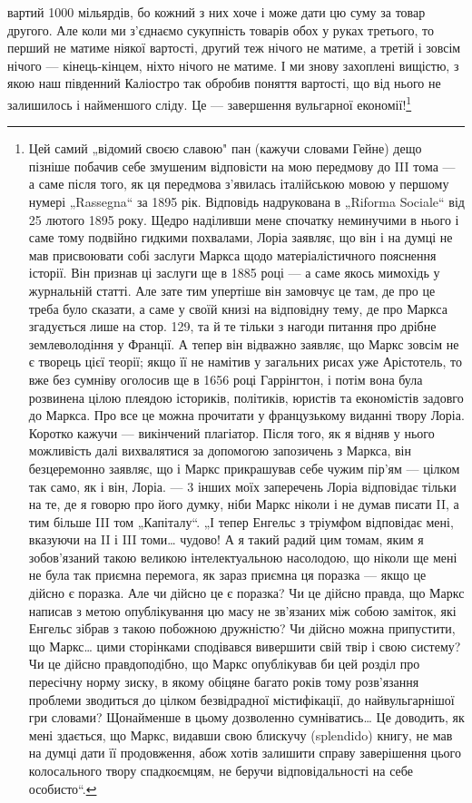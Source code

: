 \parcont{}  %
вартий 1000 мільярдів, бо кожний з них хоче і може дати цю суму за товар другого. Але коли ми з'єднаємо сукупність товарів
обох у руках третього, то перший не матиме ніякої вартості, другий теж нічого не матиме, а третій і зовсім нічого — кінець-кінцем, ніхто
нічого не матиме. І ми знову захоплені вищістю, з якою наш південний Каліостро так обробив поняття вартості,
що від нього не залишилось і найменшого сліду. Це — завершення вульгарної економії!\footnote{Цей самий „відомий своєю славою" пан (кажучи словами Гейне) дещо пізніше побачив себе змушеним відповісти на мою передмову
до III тома — а саме після того, як ця передмова з’явилась італійською мовою у першому нумері „Rassegna“ за 1895 рік.
Відповідь надрукована в „Riforma Sociale“ від 25 лютого 1895 року. Щедро наділивши мене спочатку неминучими в нього і саме
тому подвійно гидкими похвалами, Лоріа заявляє, що він і на думці не мав присвоювати собі заслуги Маркса щодо
матеріалістичного пояснення історії. Він признав ці заслуги ще в 1885 році — а саме якось мимохідь у журнальній статті. Але
зате тим упертіше він замовчує це там, де про це треба було сказати, а саме у своїй книзі на відповідну тему, де про Маркса
згадується лише на стор. 129, та й те тільки з нагоди питання про дрібне землеволодіння у Франції. А тепер він відважно
заявляє, що Маркс зовсім не є творець цієї теорії; якщо її не намітив у загальних рисах уже Арістотель, то вже без сумніву
оголосив ще в 1656 році Гаррінгтон, і потім вона була розвинена цілою плеядою істориків, політиків, юристів та економістів
задовго до Маркса. Про все це можна прочитати у французькому виданні твору Лоріа. Коротко кажучи — викінчений плагіатор.
Після того, як я відняв у нього можливість далі вихвалятися за допомогою запозичень з Маркса, він безцеремонно заявляє, що і
Маркс прикрашував себе чужим пір’ям — цілком так само, як і він, Лоріа. — 3 інших моїх заперечень Лоріа відповідає тільки на
те, де я говорю про його думку, ніби Маркс ніколи і не думав писати II, а тим більше III том „Капіталу“. „І тепер Енгельс з
тріумфом відповідає мені, вказуючи на II і III томи\dots{} чудово! А я такий радий цим томам, яким я зобов’язаний такою великою
інтелектуальною насолодою, що ніколи ще мені не була так приємна перемога, як зараз приємна ця поразка — якщо це дійсно є
поразка. Але чи дійсно це є поразка? Чи це дійсно правда, що Маркс написав з метою опублікування цю масу не зв’язаних між
собою заміток, які Енгельс зібрав з такою побожною дружністю? Чи дійсно можна припустити, що Маркс\dots{} цими сторінками
сподівався вивершити свій твір і свою систему? Чи це дійсно правдоподібно, що Маркс опублікував би цей розділ про
пересічну норму зиску, в якому обіцяне багато років тому розв’язання проблеми зводиться до цілком безвідрадної
містифікації, до найвульгарнішої гри словами? Щонайменше в цьому дозволенно сумніватись\dots{} Це доводить, як мені
здається, що Маркс,
видавши свою блискучу (splendido) книгу, не мав на думці дати її продовження, абож хотів залишити справу
заверішення цього колосального твору спадкоємцям, не беручи відповідальності на себе особисто“.

}
